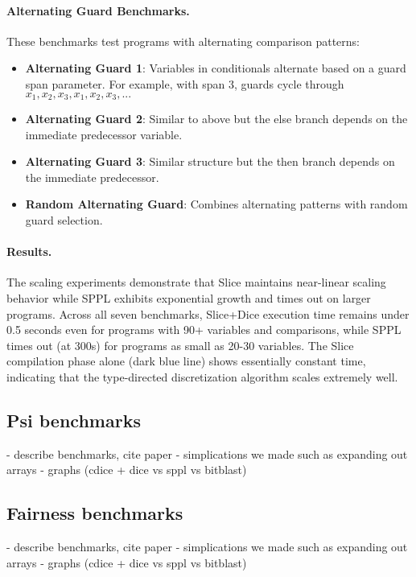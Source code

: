 \paragraph{Alternating Guard Benchmarks.}
These benchmarks test programs with alternating comparison patterns:
\begin{itemize}
\item \textbf{Alternating Guard 1}: Variables in conditionals alternate based on a guard span parameter. For example, with span 3, guards cycle through $x_1, x_2, x_3, x_1, x_2, x_3, ...$
\item \textbf{Alternating Guard 2}: Similar to above but the else branch depends on the immediate predecessor variable.
\item \textbf{Alternating Guard 3}: Similar structure but the then branch depends on the immediate predecessor.
\item \textbf{Random Alternating Guard}: Combines alternating patterns with random guard selection.
\end{itemize}



\paragraph{Results.} The scaling experiments demonstrate that Slice maintains near-linear scaling behavior while SPPL exhibits exponential growth and times out on larger programs. Across all seven benchmarks, Slice+Dice execution time remains under 0.5 seconds even for programs with 90+ variables and comparisons, while SPPL times out (at 300s) for programs as small as 20-30 variables. The Slice compilation phase alone (dark blue line) shows essentially constant time, indicating that the type-directed discretization algorithm scales extremely well.

\subsection{Psi benchmarks}\label{sec:psi-benchmarks}
- describe benchmarks, cite paper
- simplications we made such as expanding out arrays
- graphs (cdice + dice vs sppl vs bitblast)


\subsection{Fairness benchmarks}\label{sec:fairness-benchmarks}
- describe benchmarks, cite paper
- simplications we made such as expanding out arrays
- graphs (cdice + dice vs sppl vs bitblast)

